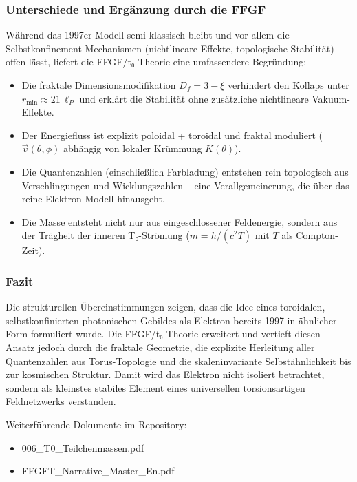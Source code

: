 \documentclass[12pt,a4paper]{article}
\begin{document}
	\subsubsection{Unterschiede und Ergänzung durch die FFGF}
	
	Während das 1997er-Modell semi-klassisch bleibt und vor allem die Selbstkonfinement-Mechanismen (nichtlineare Effekte, topologische Stabilität) offen lässt, liefert die FFGF/t₀-Theorie eine umfassendere Begründung:
	
	\begin{itemize}
		\item Die fraktale Dimensionsmodifikation $D_f = 3 - \xi$ verhindert den Kollaps unter $r_{\min} \approx 21\,\ell_P$ und erklärt die Stabilität ohne zusätzliche nichtlineare Vakuum-Effekte.
		\item Der Energiefluss ist explizit poloidal + toroidal und fraktal moduliert ($\vec{v}(\theta,\phi)$ abhängig von lokaler Krümmung $K(\theta)$).
		\item Die Quantenzahlen (einschließlich Farbladung) entstehen rein topologisch aus Verschlingungen und Wicklungszahlen – eine Verallgemeinerung, die über das reine Elektron-Modell hinausgeht.
		\item Die Masse entsteht nicht nur aus eingeschlossener Feldenergie, sondern aus der Trägheit der inneren T₀-Strömung ($m = h/(c^2 T)$ mit $T$ als Compton-Zeit).
	\end{itemize}
	
	\subsubsection{Fazit}
	
	Die strukturellen Übereinstimmungen zeigen, dass die Idee eines toroidalen, selbstkonfinierten photonischen Gebildes als Elektron bereits 1997 in ähnlicher Form formuliert wurde. Die FFGF/t₀-Theorie erweitert und vertieft diesen Ansatz jedoch durch die fraktale Geometrie, die explizite Herleitung aller Quantenzahlen aus Torus-Topologie und die skaleninvariante Selbstähnlichkeit bis zur kosmischen Struktur. Damit wird das Elektron nicht isoliert betrachtet, sondern als kleinstes stabiles Element eines universellen torsionsartigen Feldnetzwerks verstanden.
	
	Weiterführende Dokumente im Repository:
	\begin{itemize}
		\item 006\_T0\_Teilchenmassen.pdf
		\item FFGFT\_Narrative\_Master\_En.pdf
	\end{itemize}	
\end{document}
